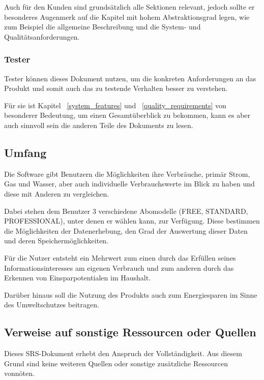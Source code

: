 Auch für den Kunden sind grundsätzlich alle Sektionen relevant,
jedoch sollte er besonderes Augenmerk auf die Kapitel mit hohem Abstraktionsgrad legen,
wie zum Beispiel die allgemeine Beschreibung und die System- und Qualitätsanforderungen. %

\subsubsection{Tester}

Tester können dieses Dokument nutzen, um die konkreten Anforderungen an das Produkt
und somit auch das zu testende Verhalten besser zu verstehen.

Für sie ist Kapitel ~\ref{system_features} und ~\ref{quality_requirements} von besonderer Bedeutung,
um einen Gesamtüberblick zu bekommen, kann es aber auch sinnvoll sein die anderen Teile des Dokuments zu lesen.

\subsection{Umfang}

Die Software gibt Benutzern die Möglichkeiten ihre Verbräuche, primär Strom, Gas und Wasser,
aber auch individuelle Verbrauchswerte im Blick zu haben und diese mit Anderen zu vergleichen.


Dabei stehen dem Benutzer 3 verschiedene Abomodelle (FREE, STANDARD, PROFESSIONAL),
unter denen er wählen kann, zur Verfügung.
Diese bestimmen die Möglichkeiten der Datenerhebung,
den Grad der Auswertung dieser Daten und deren Speichermöglichkeiten.

Für die Nutzer entsteht ein Mehrwert zum einen durch das Erfüllen seines Informationsinteresses am eigenen Verbrauch
und zum anderen durch das Erkennen von Einsparpotentialen im Haushalt.

Darüber hinaus soll die Nutzung des Produkts auch zum Energiesparen im Sinne des Umweltschutzes beitragen.

\subsection{Verweise auf sonstige Ressourcen oder Quellen}

Dieses SRS-Dokument erhebt den Anspruch der Vollständigkeit.
Aus diesem Grund sind keine weiteren Quellen oder sonstige zusätzliche Ressourcen vonnöten.
